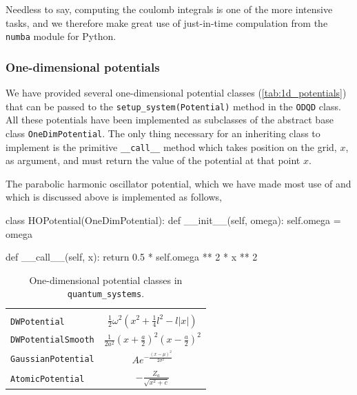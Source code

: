 Needless to say, computing the coulomb integrals is one of the more intensive tasks,
and we therefore make great use of just-in-time compulation from the \lstinline{numba} 
module for Python.

\begin{figure}

\end{figure}

\subsubsection{One-dimensional potentials}
\label{sec:1d_potentials}

We have provided several one-dimensional potential classes (\autoref{tab:1d_potentials})
that can be passed to 
the \lstinline{setup_system(Potential)} method in the \lstinline{ODQD} class.
All these potentials have been implemented as subclasses of the abstract 
base class \lstinline{OneDimPotential}. The only thing necessary for an 
inheriting class to implement is the primitive \lstinline{__call__} method which 
takes position on the grid, $x$, as argument, and must return 
the value of the potential at that point $x$.

The parabolic harmonic oscillator potential,
which we have made most use of and which is 
discussed above is implemented as follows,
\begin{python}
class HOPotential(OneDimPotential):
    def __init__(self, omega):
        self.omega = omega

    def __call__(self, x):
        return 0.5 * self.omega ** 2 * x ** 2
\end{python}

\begin{table}
    \caption{One-dimensional potential classes in \lstinline{quantum_systems}.}
    \centering
    \begin{tabular}{l c}
        \\
        \hline\hline \\ 
        \lstinline[]$DWPotential$         & 
        $\frac{1}{2}\omega^2\left(x^2 + \frac{1}{4}l^2 - l|x| \right)$ \\ [1em]
        \lstinline[]$DWPotentialSmooth$   &
        $\frac{1}{2a^2}\left(x + \frac{a}{2}\right)^2\left(x - \frac{a}{2}\right)^2$ \\ [1em]
        \lstinline[]$GaussianPotential$   &
        $Ae^{-\frac{(x-\mu)^2}{2\sigma^2}}$ \\ [1em]
        \lstinline[]$AtomicPotential$     &
        $- \frac{Z_a}{\sqrt{x^2 + c}}$ \\ [1em] \hline\hline
    \end{tabular} 
    \label{tab:1d_potentials}
\end{table}

